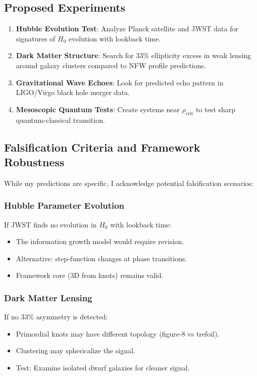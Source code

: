 \documentclass{article}
\begin{document}
\subsection{Proposed Experiments}
\begin{enumerate}
\item \textbf{Hubble Evolution Test}: Analyze Planck satellite and JWST data for signatures of $H_0$ evolution with lookback time.
\item \textbf{Dark Matter Structure}: Search for 33\% ellipticity excess in weak lensing around galaxy clusters compared to NFW profile predictions.
\item \textbf{Gravitational Wave Echoes}: Look for predicted echo pattern in LIGO/Virgo black hole merger data.
\item \textbf{Mesoscopic Quantum Tests}: Create systems near $\rho_{\text{crit}}$ to test sharp quantum-classical transition.
\end{enumerate}

\subsection{Falsification Criteria and Framework Robustness}
While my predictions are specific, I acknowledge potential falsification scenarios:

\subsubsection{Hubble Parameter Evolution}
If JWST finds no evolution in $H_0$ with lookback time:
\begin{itemize}
\item The information growth model would require revision.
\item Alternative: step-function changes at phase transitions.
\item Framework core (3D from knots) remains valid.
\end{itemize}

\subsubsection{Dark Matter Lensing}
If no 33\% asymmetry is detected:
\begin{itemize}
\item Primordial knots may have different topology (figure-8 vs trefoil).
\item Clustering may sphericalize the signal.
\item Test: Examine isolated dwarf galaxies for cleaner signal.
\end{itemize}
\end{document}
